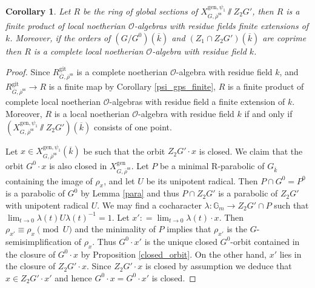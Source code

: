 \documentclass{amsart}
\newtheorem{cor}[prop]{Corollary}
\theoremstyle{definition}
\theoremstyle{remark}
\newcommand{\OO}{\mathcal O}
\newcommand{\rhobar}{\overline{\rho}}
\newcommand{\Gm}{\mathbb G_{m}}
\newcommand{\gen}{\mathrm{gen}}
\newcommand{\gps}{\mathrm{git}}
\newcommand{\kbar}{\overline{k}}
\newcommand{\rhobarss}{\rhobar^{\mathrm{ss}}}
\newcommand{\Gbar}{\overline{G}}
\begin{document}
\begin{cor}\label{semi-local_Gdash} Let $R$ be the ring of global sections of $X^{\gen, \psi_1}_{G, \rhobarss}\sslash Z_2G'$, 
then $R$ is a finite product of local noetherian $\OO$-algebras with residue fields finite extensions 
of $k$. Moreover, if the orders of $(G/G^0)(\kbar)$ and $(Z_1\cap Z_2G')(\kbar)$ are coprime then 
$R$ is a complete local noetherian $\OO$-algebra with residue field $k$.
\end{cor} 
\begin{proof}
Since $R^{\gps}_{\Gbar, \rhobarss}$ is a complete noetherian $\OO$-algebra with residue field $k$, 
and $R^{\gps}_{\Gbar, \rhobarss} \rightarrow R$ is a finite map by Corollary \ref{psi_gps_finite}, 
$R$ is a finite product of complete local noetherian $\OO$-algebras with residue field 
a finite extension of $k$. Moreover, $R$ is a local noetherian $\OO$-algebra with residue field $k$ if and only if $(X^{\gen, \psi_1}_{G, \rhobarss}\sslash Z_2G')(\kbar)$ consists of one point. 

Let $x\in X^{\gen, \psi_1}_{G, \rhobarss}(\kbar)$ be such that the orbit $Z_2G'\cdot x$ is closed. 
We claim that the orbit $G^0\cdot x$ is also closed in $X^{\gen}_{G, \rhobarss}$. Let $P$ be a minimal 
R-parabolic of $G_{\kbar}$ containing the image of $\rho_x$, and let  $U$ be its unipotent radical. 
Then $P\cap G^0= P^0$ is a parabolic of $G^0$ by Lemma \ref{para} and thus $P\cap Z_2G'$ 
is a parabolic of $Z_2G'$ with unipotent radical $U$. We may find a cocharacter $\lambda: \Gm\rightarrow
Z_2G'\cap P$ such that $\lim_{t\rightarrow 0} \lambda(t) U \lambda(t)^{-1}= {1}$. 
Let $x': = \lim_{t\rightarrow 0} \lambda(t) \cdot x$. Then $\rho_{x'} \equiv \rho_{x} \pmod{U}$ 
and the minimality of $P$ implies that $\rho_{x'}$ is the $G$-semisimplification of $\rho_x$.
Thus $G^0\cdot x'$ is the unique closed $G^0$-orbit contained in the closure of $G^0\cdot x$
by Proposition \ref{closed_orbit}.
On the other hand,  $x'$ lies in the closure 
of $Z_2G'\cdot x$.  Since 
$Z_2G'\cdot x$ is closed by assumption we deduce that $x\in Z_2G' \cdot x'$ and hence
$G^0 \cdot x = G^0\cdot x'$ is closed. 


\end{proof}
\end{document}
